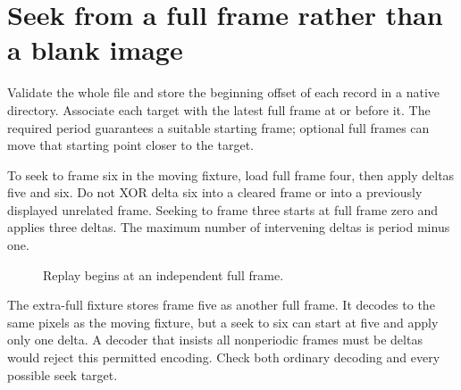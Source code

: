 \section{Seek from a full frame rather than a blank image}
Validate the whole file and store the beginning offset of each record in a native
directory. Associate each target with the latest full frame at or before it. The
required period guarantees a suitable starting frame; optional full frames can move
that starting point closer to the target.

To seek to frame six in the moving fixture, load full frame four, then apply deltas
five and six. Do not XOR delta six into a cleared frame or into a previously displayed
unrelated frame. Seeking to frame three starts at full frame zero and applies three
deltas. The maximum number of intervening deltas is period minus one.

\begin{figure}[htbp]
\centering
{}
\caption{Replay begins at an independent full frame.}
\end{figure}

The extra-full fixture stores frame five as another full frame. It decodes to the
same pixels as the moving fixture, but a seek to six can start at five and apply only
one delta. A decoder that insists all nonperiodic frames must be deltas would reject
this permitted encoding. Check both ordinary decoding and every possible seek target.
